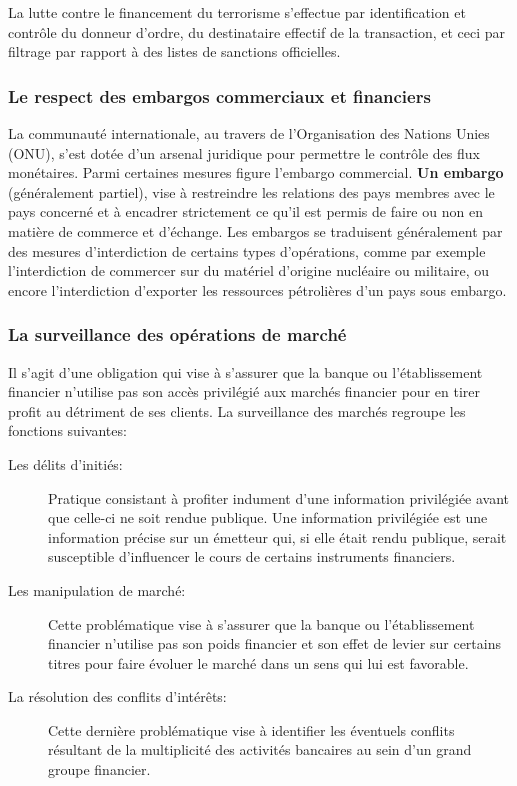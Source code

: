 La lutte contre le financement du terrorisme s'effectue par identification et
contrôle du donneur d'ordre, du destinataire effectif de la transaction, et 
ceci par filtrage par rapport à des listes de sanctions officielles.

\subsubsection{Le respect des embargos commerciaux et financiers}

La communauté internationale, au travers de l'Organisation des Nations Unies 
(ONU), s'est dotée d'un arsenal juridique pour permettre le contrôle des flux
monétaires. Parmi certaines mesures figure l'embargo commercial. \textbf{Un embargo} 
(généralement partiel), vise à restreindre les relations des pays membres
avec le pays concerné et à encadrer strictement ce qu'il est permis de faire
ou non en matière de commerce et d'échange. Les embargos se traduisent 
généralement par des mesures d'interdiction de certains types d'opérations, 
comme par exemple l'interdiction de commercer sur du matériel d'origine 
nucléaire ou militaire, ou encore l'interdiction d'exporter les ressources 
pétrolières d'un pays sous embargo.

\subsubsection{La surveillance des opérations de marché}

Il s'agit d'une obligation qui vise à s'assurer que la banque ou l'établissement
financier n'utilise pas son accès privilégié aux marchés financier pour en tirer
profit au détriment de ses clients. La surveillance des marchés regroupe les
fonctions suivantes:
\begin{description}
  \item[Les délits d'initiés:]
    Pratique consistant à profiter indument d'une information privilégiée avant
    que celle-ci ne soit rendue publique. Une information privilégiée est une 
    information précise sur un émetteur qui, si elle était rendu publique, 
    serait susceptible d'influencer le cours de certains instruments 
    financiers.
  \item[Les manipulation de marché: ]
    Cette problématique vise à s'assurer que la banque ou l'établissement 
    financier n'utilise pas son poids financier et son effet de levier sur 
    certains titres pour faire évoluer le marché dans un sens qui lui est 
    favorable. 
  \item[La résolution des conflits d'intérêts: ]
    Cette dernière problématique vise à identifier les éventuels conflits 
    résultant de la multiplicité des activités bancaires au sein d'un grand
    groupe financier.
\end{description}


